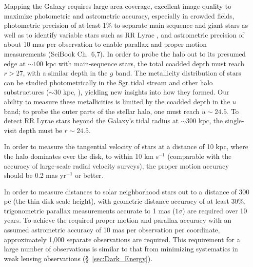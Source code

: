 Mapping the Galaxy requires large area coverage, excellent image
quality to maximize photometric and astrometric accuracy,
especially in crowded fields, photometric precision of at least 1\% to
separate main sequence and
giant stars \cite[e.g.,][]{2003ApJ...586..195H} as well as to identify variable
stars such as RR Lyrae \citep{2010ApJ...708..717S,2011ApJ...728..106S},
and astrometric precision of about 10 mas per observation to enable parallax and proper motion measurements
(SciBook Ch.~6,7). In order to probe the halo out to its presumed edge at $\sim100$ kpc \citep{2004ASPC..327..104I}
with main-sequence stars, the total coadded depth must reach $r > 27$, with a similar depth in the $g$ band.
The metallicity distribution of stars can be studied photometrically in the Sgr tidal stream
\cite[e.g., see][]{2003ApJ...599.1082M,2007ApJ...670..346C} and other halo substructures
($\sim 30$ kpc, \citealt{2007Natur.450.1020C}), yielding new insights into how
they formed.  Our ability to measure these metallicities is limited by
the coadded depth in the $u$ band; to probe the outer parts of the
stellar halo, one must reach
$u\sim24.5$. To detect RR Lyrae stars beyond the Galaxy's tidal radius at $\sim 300$ kpc, the single-visit depth must
be $r \sim  24.5$.

In order to measure the tangential velocity of stars at a distance of 10 kpc, where the halo dominates over the disk, to
within 10 km s$^{-1}$ (comparable with the accuracy of
large-scale radial velocity surveys), the proper motion
accuracy should be 0.2 mas yr$^{-1}$ or better. 

%


In order to measure distances to solar neighborhood stars out to a distance of 300 pc (the thin disk scale height),
with geometric distance accuracy of at least 30\%, trigonometric parallax measurements accurate to 1 mas ($1\sigma$)
are required over 10 years. To achieve the required proper motion and parallax accuracy with an assumed astrometric
accuracy of 10 mas per observation per coordinate, approximately 1,000
separate observations are required. This requirement for a large
number of observations is similar to that from minimizing
systematics in weak lensing observations (\S~\ref{sec:Dark_Energy}).


